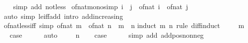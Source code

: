 \begin{isabellebody}
%
\isadelimproof
\ \ %
\endisadelimproof
%
\isatagproof
{}\isamarkupfalse%
\ {\isacharparenleft}{\kern0pt}simp\ add{\isacharcolon}{\kern0pt}\ not{\isacharunderscore}{\kern0pt}less{\isacharparenright}{\kern0pt}%
\endisatagproof
{\isafoldproof}%
%
\isadelimproof
\isanewline
%
\endisadelimproof
\isanewline
{}\isamarkupfalse%
\ of{\isacharunderscore}{\kern0pt}nat{\isacharunderscore}{\kern0pt}mono{\isacharbrackleft}{\kern0pt}simp{\isacharbrackright}{\kern0pt}{\isacharcolon}{\kern0pt}\ {\isachardoublequoteopen}i\ {\isasymle}\ j\ {\isasymLongrightarrow}\ of{\isacharunderscore}{\kern0pt}nat\ i\ {\isasymle}\ of{\isacharunderscore}{\kern0pt}nat\ j{\isachardoublequoteclose}\isanewline
%
\isadelimproof
\ \ %
\endisadelimproof
%
\isatagproof
{}\isamarkupfalse%
\ {\isacharparenleft}{\kern0pt}auto\ simp{\isacharcolon}{\kern0pt}\ le{\isacharunderscore}{\kern0pt}iff{\isacharunderscore}{\kern0pt}add\ intro{\isacharbang}{\kern0pt}{\isacharcolon}{\kern0pt}\ add{\isacharunderscore}{\kern0pt}increasing{}{\isacharparenright}{\kern0pt}%
\endisatagproof
{\isafoldproof}%
%
\isadelimproof
\isanewline
%
\endisadelimproof
\isanewline
{}\isamarkupfalse%
\ of{\isacharunderscore}{\kern0pt}nat{\isacharunderscore}{\kern0pt}less{\isacharunderscore}{\kern0pt}iff\ {\isacharbrackleft}{\kern0pt}simp{\isacharbrackright}{\kern0pt}{\isacharcolon}{\kern0pt}\ {\isachardoublequoteopen}of{\isacharunderscore}{\kern0pt}nat\ m\ {\isacharless}{\kern0pt}\ of{\isacharunderscore}{\kern0pt}nat\ n\ {\isasymlongleftrightarrow}\ m\ {\isacharless}{\kern0pt}\ n{\isachardoublequoteclose}\isanewline
%
\isadelimproof
%
\endisadelimproof
%
\isatagproof
{}\isamarkupfalse%
{\isacharparenleft}{\kern0pt}induct\ m\ n\ rule{\isacharcolon}{\kern0pt}\ diff{\isacharunderscore}{\kern0pt}induct{\isacharparenright}{\kern0pt}\isanewline
\ \ \isamarkupfalse%
\ {\isacharparenleft}{\kern0pt}{}\ m{\isacharparenright}{\kern0pt}\ \isamarkupfalse%
\ \isamarkupfalse%
\ {\isacharquery}{\kern0pt}case\isanewline
\ \ \ \ \isamarkupfalse%
\ auto\isanewline
{}\isamarkupfalse%
\isanewline
\ \ \isamarkupfalse%
\ {\isacharparenleft}{\kern0pt}{}\ n{\isacharparenright}{\kern0pt}\ \isamarkupfalse%
\ \isamarkupfalse%
\ {\isacharquery}{\kern0pt}case\isanewline
\ \ \ \ \isamarkupfalse%
\ {\isacharparenleft}{\kern0pt}simp\ add{\isacharcolon}{\kern0pt}\ add{\isacharunderscore}{\kern0pt}pos{\isacharunderscore}{\kern0pt}nonneg{\isacharparenright}{\kern0pt}\isanewline

\end{isabellebody}

